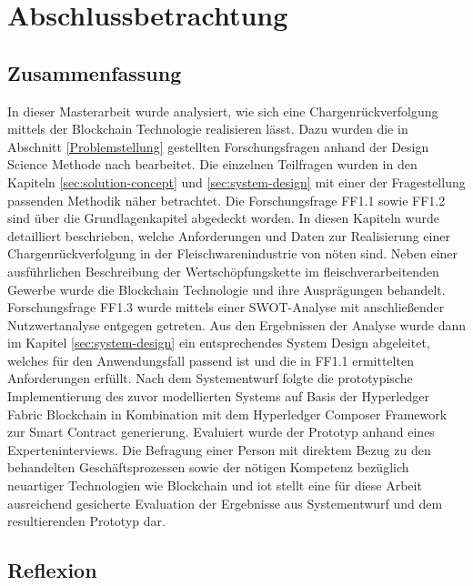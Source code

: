 \section{Abschlussbetrachtung} \label{sec:concluding-review}

\subsection{Zusammenfassung}

In dieser Masterarbeit wurde analysiert, wie sich eine Chargenrückverfolgung mittels der Blockchain Technologie realisieren lässt. Dazu wurden die in Abschnitt \ref{Problemstellung} gestellten Forschungsfragen anhand der Design Science Methode nach \citet{Hevner2007} bearbeitet. Die einzelnen Teilfragen wurden in den Kapiteln \ref{sec:solution-concept} und \ref{sec:system-design} mit einer der Fragestellung passenden Methodik näher betrachtet. Die Forschungsfrage FF1.1 sowie FF1.2 sind über die Grundlagenkapitel abgedeckt worden. In diesen Kapiteln wurde detailliert beschrieben, welche Anforderungen und Daten zur Realisierung einer Chargenrückverfolgung in der Fleischwarenindustrie von nöten sind. Neben einer ausführlichen Beschreibung der Wertschöpfungskette im fleischverarbeitenden Gewerbe wurde die Blockchain Technologie und ihre Ausprägungen behandelt. Forschungsfrage FF1.3 wurde mittels einer SWOT-Analyse mit anschließender Nutzwertanalyse entgegen getreten. Aus den Ergebnissen der Analyse wurde dann im Kapitel \ref{sec:system-design} ein entsprechendes System Design abgeleitet, welches für den Anwendungsfall passend ist und die in FF1.1 ermittelten Anforderungen erfüllt. Nach dem Systementwurf folgte die prototypische Implementierung des zuvor modellierten Systems auf Basis der Hyperledger Fabric Blockchain in Kombination mit dem Hyperledger Composer Framework zur Smart Contract generierung. Evaluiert wurde der Prototyp anhand eines Experteninterviews. Die Befragung einer Person mit direktem Bezug zu den behandelten Geschäftsprozessen sowie der nötigen Kompetenz bezüglich neuartiger Technologien wie Blockchain und \ac{iot} stellt eine für diese Arbeit ausreichend gesicherte Evaluation der Ergebnisse aus Systementwurf und dem resultierenden Prototyp dar.

\subsection{Reflexion}

